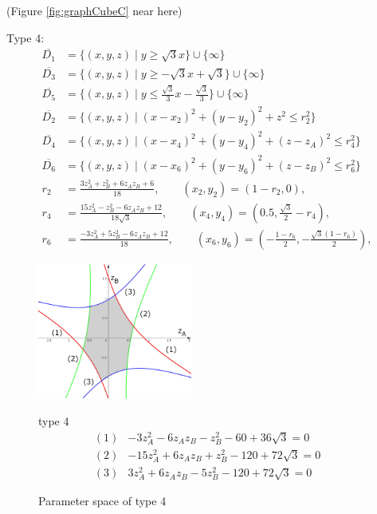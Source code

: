 \documentclass[suppldata, dvipdfmx]{interact}
\theoremstyle{plain}%
\theoremstyle{definition}
\theoremstyle{remark}
\theoremstyle{problemstyle}
\begin{document}
\noindent(Figure \ref{fig:graphCubeC} near here)
\bigskip\par
Type 4:
\begin{align*}
\overline{D_1}&=\{ (x,y,z) \mid y \ge \sqrt{3}x \} \cup \{ \infty \}\\
\overline{D_3}&=\{(x,y,z) \mid y \ge -\sqrt{3}x + \sqrt{3} \} \cup\{\infty\}\\
\overline{D_5}&=\{(x,y,z) \mid y \le \frac{\sqrt{3}}{3}x - \frac{\sqrt{3}}{3} \} \cup\{\infty\}\\
\overline{D_2}&=\{(x,y,z) \mid (x-x_2)^2+(y-y_2)^2+z^2 \le r_2^2 \} \\
\overline{D_4}&=\{(x,y,z) \mid (x-x_4)^2+(y-y_4)^2+(z-z_A)^2 \le r_4^2 \} \\
\overline{D_6}&=\{(x,y,z) \mid (x-x_6)^2+(y-y_6)^2+(z-z_B)^2\le r_6^2 \} \\
 r_2 &= \frac{3z_A^2 + z_B^2 + 6z_Az_B + 6}{18}, \qquad
(x_2, y_2) = \left(1 - r_2, 0\right),\\
 r_4 &= \frac{15z_A^2 - z_B^2 - 6z_Az_B + 12}{18\sqrt{3}}, \qquad
(x_4, y_4) = \left(0.5, \frac{\sqrt{3}}{2} - r_4\right),\\
 r_6 &= \frac{-3z_A^2 + 5z_B^2 - 6z_Az_B + 12}{18}, \qquad
(x_6, y_6) = \left(-\frac{1 - r_6}{2}, -\frac{\sqrt{3}(1 - r_6)}{2}\right),
\end{align*} 
\begin{figure}[h]
 \begin{minipage}[]{0.5\textwidth}
 \centering
 \includegraphics[width=2in,
 keepaspectratio]{./img/graph/cubeD.jpg}
 \caption{Parameter space of type 4}
 \label{fig:graphCubeD}
 \end{minipage}
 \hspace*{\fill}
 \begin{minipage}[]{0.5\textwidth}
  \centering
  type 4
  \begin{align*}
   (1)& -3z_A^2 - 6z_A z_B - z_B^2 -60 +36\sqrt{3} = 0\\
   (2)& -15 z_A^2 + 6z_Az_B + z_B^2 - 120 + 72\sqrt{3} = 0\\
   (3)& 3z_A^2 + 6z_Az_B - 5z_B^2 - 120 + 72 \sqrt{3} = 0
  \end{align*}
 \end{minipage}
 \hspace*{\fill}
\end{figure}
\end{document}
